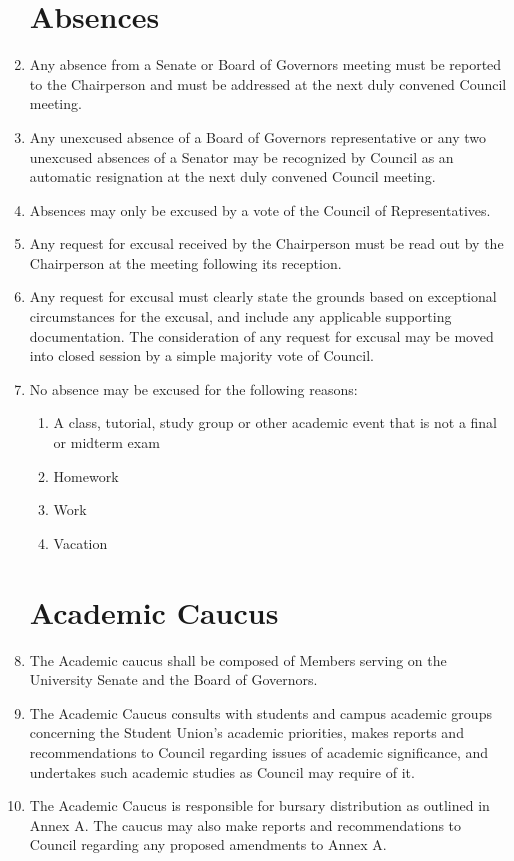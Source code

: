 \documentclass[oneside]{book}
\begin{document}
\begin{enumerate}
\chapter{\label{University_bodies_absences}Absences}
\item Any absence from a Senate or Board of Governors meeting must be reported to the Chairperson and must be addressed at the next duly convened Council meeting.
\item Any unexcused absence of a Board of Governors representative or any two unexcused absences of a Senator may be recognized by Council as an automatic resignation at the next duly convened Council meeting. 
\item Absences may only be excused by a vote of the Council of Representatives.
\item Any request for excusal received by the Chairperson must be read out by the Chairperson at the meeting following its reception. 
\item Any request for excusal must clearly state the grounds based on exceptional circumstances for the excusal, and include any applicable supporting documentation. The consideration of any request for excusal may be moved into closed session by a simple majority vote of Council.
\item No absence may be excused for the following reasons:
\begin{enumerate}
\item A class, tutorial, study group or other academic event that is not a final or midterm exam
\item Homework
\item Work
\item Vacation
\end{enumerate}


\chapter{\label{Academic_Caucus}Academic Caucus}
\item The Academic caucus shall be composed of Members serving on the University Senate and the Board of Governors.
\item The Academic Caucus consults with students and campus academic groups concerning the Student Union's academic priorities, makes reports and recommendations to Council regarding issues of academic significance, and undertakes such academic studies as Council may require of it.
\item The Academic Caucus is responsible for bursary distribution as outlined in Annex A. The caucus may also make reports and recommendations to Council regarding any proposed amendments to Annex A. 


\end{enumerate}
\end{document}
